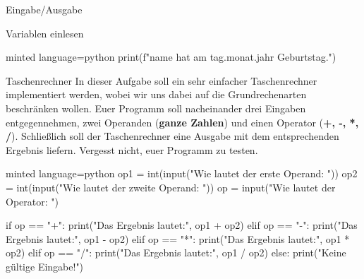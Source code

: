 \begin{task}[points=auto]{Eingabe/Ausgabe }
\begin{subtask*}[points=0]{Variablen einlesen}
\begin{solution}
\begin{codeBlock}[]{minted language=python}
                print(f"{name} hat am {tag}.{monat}.{jahr} Geburtstag.")
            \end{codeBlock}
        \end{solution}
    \end{subtask*}
    \begin{subtask*}[points=0]{Taschenrechner}
        In dieser Aufgabe soll ein sehr einfacher Taschenrechner implementiert werden, wobei wir uns dabei auf die Grundrechenarten beschränken wollen. Euer Programm soll nacheinander drei Eingaben entgegennehmen, zwei Operanden (\textbf{ganze Zahlen}) und einen Operator (\textbf{+, -, *, /}). Schließlich soll der Taschenrechner eine Ausgabe mit dem entsprechenden Ergebnis liefern. Vergesst nicht, euer Programm zu testen.

        \begin{solution}
            \begin{codeBlock}[]{minted language=python}
                op1 = int(input("Wie lautet der erste Operand: "))
                op2 = int(input("Wie lautet der zweite Operand: "))
                op = input("Wie lautet der Operator: ")

                if op == "+":
                    print("Das Ergebnis lautet:", op1 + op2)
                elif op == "-":
                    print("Das Ergebnis lautet:", op1 - op2)
                elif op == "*":
                    print("Das Ergebnis lautet:", op1 * op2)
                elif op == "/":
                    print("Das Ergebnis lautet:", op1 / op2)
                else:
                    print("Keine gültige Eingabe!")
            \end{codeBlock}
        \end{solution}
    \end{subtask*}
\end{task}

